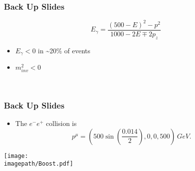 
\begin{frame}\frametitle{Back Up Slides }

    \begin{minipage}{0.49\textwidth}
        \begin{equation*}
          {E}_{\gamma} = \frac{ {(500 - E)}^2 - {p}^{2}}{1000 -2 E  \mp 2{p}_{z}}
        \end{equation*}
        \begin{itemize}
        \item ${E}_{\gamma} < 0$ in \sim 20\% of events
        \item $m_{inv}^{2} < 0$
        \end{itemize}
    \end{minipage}\hfill
    \begin{minipage}{0.49\textwidth}
        \resizebox{0.95\linewidth}{!}{%
        \centering
        
        }
        \\
        \centering
        
    \end{minipage}

\end{frame}

\begin{frame}\frametitle{Back Up Slides }

     \begin{minipage}{0.49\textwidth}
         \begin{itemize}
             \item The ${e}^{-}{e}^{+}$ collision is 
             \begin{equation}
                 {p}^{\mu} = ( 500 \sin{(\frac{0.014}{2})}, 0, 0, 500)\, GeV.
             \end{equation}
        \end{itemize}
     \end{minipage}\hfill
     \begin{minipage}{0.49\textwidth}
         \texttt{[image: \\imagepath/Boost.pdf]}
     \end{minipage}

\end{frame}

